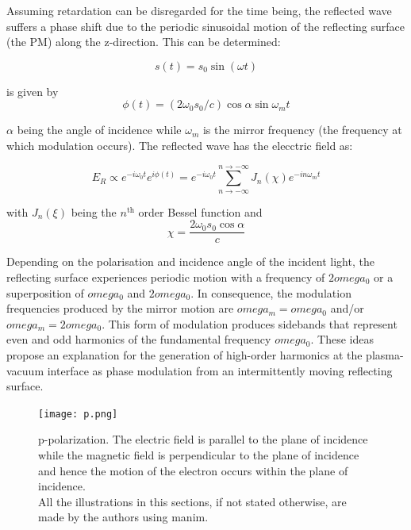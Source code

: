 Assuming retardation can be disregarded for the time being, the reflected wave suffers a phase shift due to the periodic sinusoidal motion of the reflecting surface (the PM) along the z-direction. This can be determined:

\begin{equation*}
    s(t) = s_0 \sin(\omega t)
\end{equation*}

is given by
\begin{equation*}
    \phi(t) = (2\omega_0s_0/c)\cos\alpha \sin \omega_m t
\end{equation*}

$\alpha$ being the angle of incidence while $\omega_m$ is the mirror frequency (the frequency at which modulation occurs). The reflected wave has the elecctric field as:

\begin{equation}
    E_R \propto e^{-i\omega_0 t}e^{i\phi(t)} =  e^{-i\omega_0 t} \sum _{n \to -\infty}^{n \to -\infty}J_n(\chi) e^{-in\omega_m t}
\end{equation}

with $J_n(\xi)$ being the $n^{\text{th}}$ order Bessel function and
\begin{equation}
    \label{eq:chi-def}
    \chi = \frac{2\omega_0s_0\cos\alpha}{c}
\end{equation}

Depending on the polarisation and incidence angle of the incident light, the reflecting surface experiences periodic motion with a frequency of $2omega_0$ or a superposition of $omega_0$ and $2omega_0$. In consequence, the modulation frequencies produced by the mirror motion are $omega_m = omega_0$ and/or $omega_m = 2omega_0$. This form of modulation produces sidebands that represent even and odd harmonics of the fundamental frequency $omega_0$. These ideas propose an explanation for the generation of high-order harmonics at the plasma-vacuum interface as phase modulation from an intermittently moving reflecting surface.

\label{section:selection}
\begin{figure}[H]
    \centering
    \texttt{[image: p.png]}
    \caption{p-polarization. The electric field is parallel to the plane of incidence while the magnetic field is perpendicular to the plane of incidence and hence the motion of the electron occurs within the plane of incidence.\\All the illustrations in this sections, if not stated otherwise, are made by the authors using manim\cite{manim}.}
    \label{fig:p-polarized}
\end{figure}

